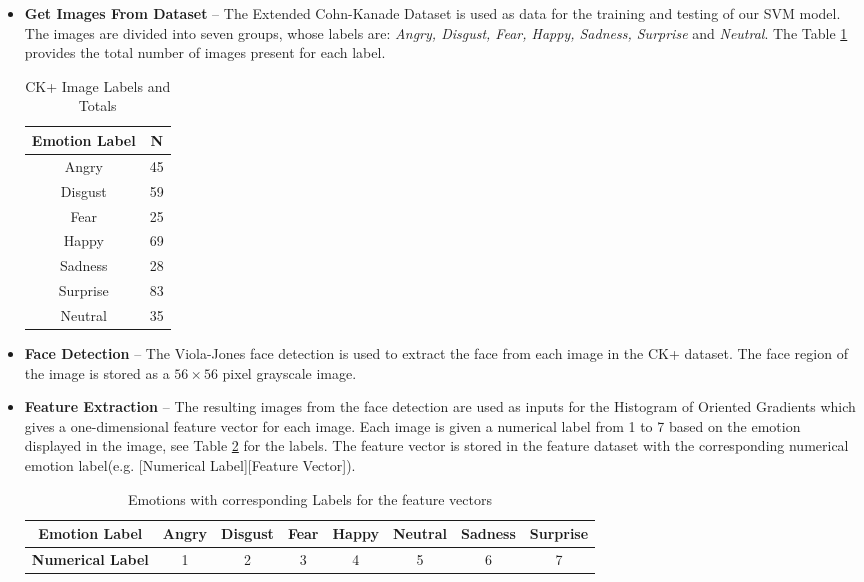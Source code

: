 \begin{itemize}
  \item \textbf{Get Images From Dataset} -- The Extended Cohn-Kanade Dataset \citep{ck} is used as data for the training and testing of our SVM model. The images are divided into seven groups, whose labels are: \textit{Angry, Disgust, Fear, Happy, Sadness, Surprise} and \textit{Neutral}. The Table \ref{table:1} provides the total number of images present for each label.

\begin{table}[H]
\centering
\begin{tabular}{ |c||c|}	
	\hline
	\textbf{Emotion Label} & \textbf{N}  \\
	\hline 
	Angry & 45 \\ 
	Disgust & 59 \\ 
	Fear & 25 \\ 
	Happy & 69 \\ 
	Sadness & 28 \\ 
	Surprise & 83 \\  
	Neutral & 35 \\
	\hline  
\end{tabular}
\caption{CK+ Image Labels and Totals}
\label{table:1}
\end{table}

  \item \textbf{Face Detection} -- The Viola-Jones face detection is used to extract the face from each image in the CK+ dataset. The face region of the image is stored as a $56 \times 56$ pixel grayscale image. 
  
  \item \textbf{Feature Extraction} -- The resulting images from the face detection are used as inputs for the Histogram of Oriented Gradients which gives a one-dimensional feature vector for each image. Each image is given a numerical label from 1 to 7 based on the emotion displayed in the image, see Table \ref{table:22} for the labels. The feature vector is stored in the feature dataset with the corresponding numerical emotion label(e.g. [Numerical Label][Feature Vector]). 
\begin{table}[H]
\centering
\begin{tabular}{ |c||c|c|c|c|c|c|c|}
	\hline
	\textbf{Emotion Label}  & Angry & Disgust & Fear & Happy & Neutral & Sadness & Surprise \\ 
	\hline
	\textbf{Numerical Label} & 1 & 2 & 3 & 4 & 5 & 6 & 7   \\ 
	\hline
\end{tabular}   
\caption{Emotions with corresponding Labels for the feature vectors}
\label{table:22}
\end{table}


\end{itemize}
